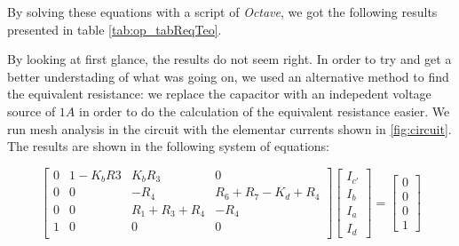 \hfill

%       
%       



By solving these equations with a script of \textit{Octave}, we got the following results presented in table \ref{tab:op_tabReqTeo}.


By looking at first glance, the results do not seem right. In order to try and get a better understading of what was going on, we used an alternative method to find the equivalent resistance: we replace the capacitor with an indepedent voltage source of $1 A$ in order to do the calculation of the equivalent resistance easier.
We run mesh analysis in the circuit with the elementar currents shown in \ref{fig:circuit}. The results are shown in the following system of equations:

\[
  \begin{bmatrix}
    0 & 1-K_b R3 & K_b R_3         & 0                     \\
    0 & 0        & -R_4            & R_6 + R_7 - K_d + R_4 \\
    0 & 0        & R_1 + R_3 + R_4 & -R_4                  \\
    1 & 0        & 0               & 0                     \\
  \end{bmatrix}
  \begin{bmatrix}
    I_{c'} \\ I_b \\ I_a \\ I_d
  \end{bmatrix}
  =
  \begin{bmatrix}
    0 \\ 0 \\ 0 \\ 1
  \end{bmatrix}
\]

